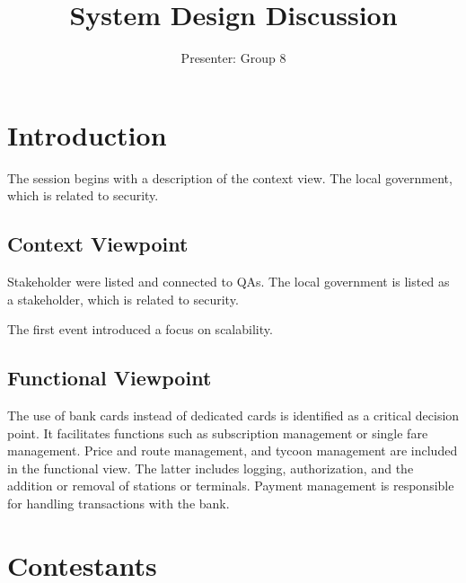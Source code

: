 \documentclass{article}
\title{System Design Discussion}
\author{Presenter: Group 8}
\begin{document}
\maketitle

\section{Introduction}
The session begins with a description of the context view. The local government, which is related to security. 

\subsection{Context Viewpoint}
Stakeholder were listed and connected to QAs.
The local government is listed as a stakeholder, which is related to security.

The first event introduced a focus on scalability.

\subsection{Functional Viewpoint}
The use of bank cards instead of dedicated cards is identified as a critical decision point.
It facilitates functions such as subscription management or single fare management.
Price and route management, and tycoon management are included in the functional view.
The latter includes logging, authorization, and the addition or removal of stations or terminals. Payment management is responsible for handling transactions with the bank.

\section{Contestants}
\end{document}
